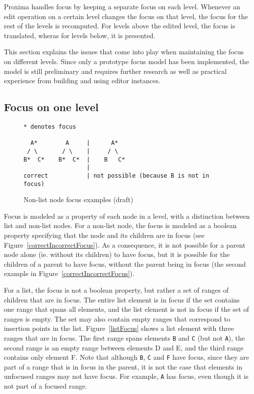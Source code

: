 Proxima handles focus by keeping a separate focus on each level. Whenever an edit operation on a certain level changes the focus on that level, the focus for the rest of the levels is recomputed. For levels above the edited level, the focus is translated, wheras for levels below, it is presented.

This section explains the issues that come into play when maintaining the focus on different levels. Since only a prototype focus model has been implemented, the model is still preliminary and requires further research as well as practical experience from building and using editor instances. 

 
%																
\subsection{Focus on one level}

\begin{figure}
\begin{small}
\begin{center}
\begin{verbatim}
* denotes focus

  A*        A     |      A*
 / \       / \    |     / \
B*  C*    B*  C*  |    B   C*
                  |
correct           | not possible (because B is not in focus)
\end{verbatim}
\caption{Non-list node focus examples (draft)}\label{correctIncorrect focus} 
\end{center}
\end{small}
\end{figure}

Focus is modeled as a property of each node in a level, with a distinction between list and non-list nodes. For a non-list node, the focus is modeled as a boolean property specifying that the node and its children are in focus (see Figure~\ref{correctIncorrectFocus}). As a consequence, it is not possible for a parent node alone (ie. without its children) to have focus, but it is possible for the children of a parent to have focus, without the parent being in focus (the second example in Figure~\ref{correctIncorrectFocus}).

For a list, the focus is not a boolean property, but rather a set of ranges of children that are in focus. The entire list element is in focus if the set contains one range that spans all elements, and the list element is not in focus if the set of ranges is empty. The set may also contain empty ranges that correspond to insertion points in the list. Figure~\ref{listFocus} shows a list element with three ranges that are in focus. The first range spans elements \verb|B| and \verb|C| (but not \verb|A|), the second range is an empty range between elements D and E, and the third range contains only element F. Note that although \verb|B|, \verb|C| and \verb|F| have focus, since they are part of a range that is in focus in the parent, it is not the case that elements in unfocused ranges may not have focus. For example, \verb|A| has focus, even though it is not part of a focused range. 

